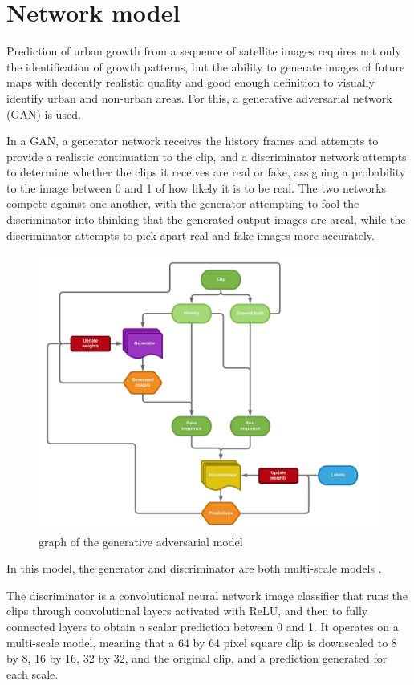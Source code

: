 \documentclass{article}
\begin{document}
\section{Network model}

Prediction of urban growth from a sequence of satellite images requires not only the identification of growth patterns, but the ability to generate images of future maps with decently realistic quality and good enough definition to visually identify urban and non-urban areas. For this, a generative adversarial network (GAN) is used. \cite{goodfellow}

In a GAN, a generator network receives the history frames and attempts to provide a realistic continuation to the clip, and a discriminator network attempts to determine whether the clips it receives are real or fake, assigning a probability to the image between 0 and 1 of how likely it is to be real. The two networks compete against one another, with the generator attempting to fool the discriminator into thinking that the generated output images are areal, while the discriminator attempts to pick apart real and fake images more accurately.

\begin{figure}[H]
    \caption{graph of the generative adversarial model}
    \centering
    \includegraphics[width=0.7\linewidth]{gan-graph.png}
\end{figure}

\clearpage

In this model, the generator and discriminator are both multi-scale models \cite{multiscale}.

The discriminator is a convolutional neural network image classifier that runs the clips through convolutional layers activated with ReLU, and then to fully connected layers to obtain a scalar prediction between 0 and 1. It operates on a multi-scale model, meaning that a 64 by 64 pixel square clip is downscaled to 8 by 8, 16 by 16, 32 by 32, and the original clip, and a prediction generated for each scale.
\end{document}
